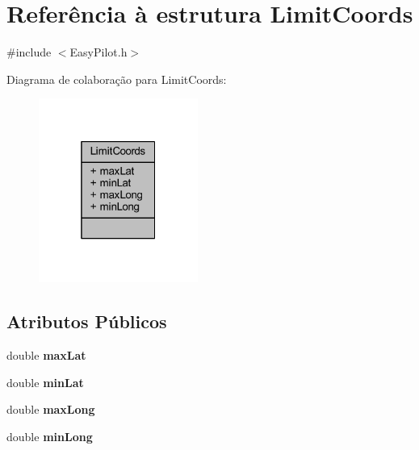 \hypertarget{struct_limit_coords}{}\section{Referência à estrutura Limit\+Coords}
\label{struct_limit_coords}


{\ttfamily \#include $<$Easy\+Pilot.\+h$>$}



Diagrama de colaboração para Limit\+Coords\+:
\nopagebreak
\begin{figure}[H]
\begin{center}
\leavevmode
\includegraphics[width=148pt]{struct_limit_coords__coll__graph}
\end{center}
\end{figure}
\subsection*{Atributos Públicos}
\begin{DoxyCompactItemize}
\item 
\hypertarget{struct_limit_coords_a9a0fcf9e011923cb568a1c584a51f654}{}double {\bfseries max\+Lat}\label{struct_limit_coords_a9a0fcf9e011923cb568a1c584a51f654}

\item 
\hypertarget{struct_limit_coords_a1a647ec24500cd353ef30d0de159f0be}{}double {\bfseries min\+Lat}\label{struct_limit_coords_a1a647ec24500cd353ef30d0de159f0be}

\item 
\hypertarget{struct_limit_coords_aeaddaee7845266a6f234ffd50f748ae4}{}double {\bfseries max\+Long}\label{struct_limit_coords_aeaddaee7845266a6f234ffd50f748ae4}

\item 
\hypertarget{struct_limit_coords_a3ef4041cf2ffec8011de8ff137180895}{}double {\bfseries min\+Long}\label{struct_limit_coords_a3ef4041cf2ffec8011de8ff137180895}

\end{DoxyCompactItemize}



